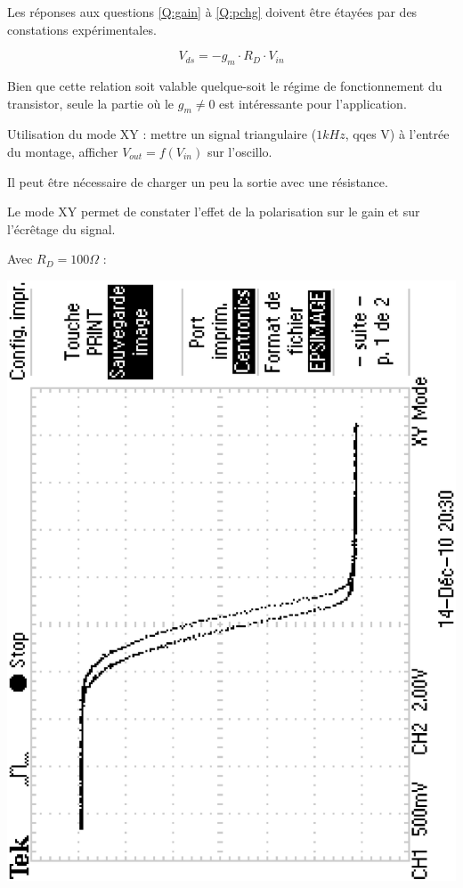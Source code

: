 \documentclass{../template/tp}
\begin{document}
Les réponses aux questions \ref{Q:gain} à \ref{Q:pchg} doivent être étayées par des constations expérimentales.

{
$$V_{ds}=-g_m\cdot R_D \cdot V_{in}$$

Bien que cette relation soit valable quelque-soit le régime de fonctionnement du transistor, seule la partie où le $g_m\neq 0$ est intéressante pour l'application.

Utilisation du mode XY :
mettre un signal triangulaire ($1kHz$, qqes V) à l'entrée du montage, afficher $V_{out}=f(V_{in})$ sur l'oscillo.

 Il peut être nécessaire de charger un peu la sortie avec une résistance.

Le mode XY permet de constater l'effet de la polarisation sur le gain et sur l'écrêtage du signal.

Avec $R_D=100\Omega$ :
\begin{center}
\includegraphics[angle=270, width=10 cm]{mesures/tek0004.eps}

\end{center}
}
\end{document}
